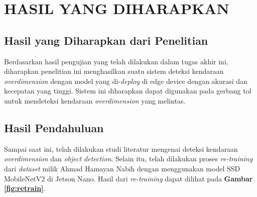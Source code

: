 \chapter{HASIL YANG DIHARAPKAN}
\label{chap:hasilyangdiharapkan}


\section{Hasil yang Diharapkan dari Penelitian}

Berdasarkan hasil pengujian yang telah dilakukan dalam tugas akhir ini, diharapkan penelitian ini menghasilkan suatu sistem deteksi kendaraan \emph{overdimension} dengan model yang di-\emph{deploy} di edge device dengan akurasi dan kecepatan yang tinggi. Sistem ini diharapkan dapat digunakan pada gerbang tol untuk mendeteksi kendaraan \emph{overdimension} yang melintas.


\section{Hasil Pendahuluan}

Sampai saat ini, telah dilakukan studi literatur mengenai deteksi kendaraan \emph{overdimension} dan \emph{object detection}. Selain itu, telah dilakukan proses \emph{re-training} dari \emph{dataset} milik Ahmad Hamayan Nabih \parencite*{hamayan2024} dengan menggunakan model SSD MobileNetV2 di Jetson Nano. Hasil dari \emph{re-training} dapat dilihat pada \textbf{Gambar \ref{fig:retrain}}.

